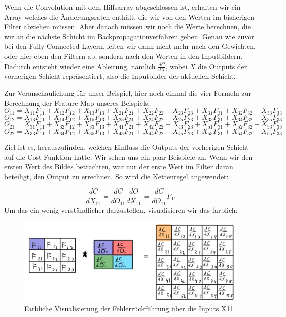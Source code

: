 \documentclass[12pt]{article}
\begin{document}
Wenn die Convolution mit dem Hilfsarray abgeschlossen ist, erhalten wir ein Array welches die Änderungsraten enthält, die wir von den Werten im bisherigen Filter abziehen müssen.
Aber danach müssen wir noch die Werte berechnen, die wir an die nächste Schicht im Backpropagationverfahren geben. Genau wie zuvor bei den Fully Connected Layern, leiten wir dann nicht mehr nach den Gewichten, oder hier eben den Filtern ab, sondern nach den Werten in den Inputbildern. Dadurch entsteht wieder eine Ableitung, nämlich $\frac {dC} {dX}$, wobei $X$ die Outputs der vorherigen Schicht repräsentiert, also die Inputbilder der aktuellen Schicht.

Zur Veranschaulichung für unser Beispiel, hier noch einmal die vier Formeln zur Berechnung der Feature Map unseres Beispiels:
$$O_{11} = X_{11}F_{11}+X_{12}F_{12}+X_{13}F_{13}+X_{21}F_{21}+X_{22}F_{22}+X_{23}F_{23}+X_{31}F_{31}+X_{32}F_{32}+X_{33}F_{33}$$
$$O_{12} = X_{13}F_{11}+X_{14}F_{12}+X_{15}F_{13}+X_{23}F_{21}+X_{24}F_{22}+X_{25}F_{23}+X_{33}F_{31}+X_{34}F_{32}+X_{35}F_{33}$$
$$O_{21} = X_{31}F_{11}+X_{32}F_{12}+X_{33}F_{13}+X_{41}F_{21}+X_{42}F_{22}+X_{43}F_{23}+X_{51}F_{31}+X_{52}F_{32}+X_{53}F_{33}$$
$$O_{22} = X_{33}F_{11}+X_{34}F_{12}+X_{35}F_{13}+X_{43}F_{21}+X_{44}F_{22}+X_{45}F_{23}+X_{53}F_{31}+X_{54}F_{32}+X_{55}F_{33}$$

Ziel ist es, herauszufinden, welchen Einfluss die Outputs der vorherigen Schicht auf die Cost Funktion hatte.
Wir sehen uns ein paar Beispiele an. Wenn wir den ersten Wert des Bildes betrachten, war nur der erste Wert im Filter daran beteiligt, den Output zu errechnen. So wird die Kettenregel angewendet:

$$\frac {dC} {dX_{11}} = 
\frac {dC}{dO_{11}} \frac {dO}{dX_{11}} =
\frac {dC}{dO_{11}} F_{11}$$
Um das ein wenig verständlicher darzustellen, visualisieren wir das farblich:

\begin{figure}[H]
\centering
\includegraphics[scale=0.27]{Images/017_BackProp_X11.png}
\caption{Farbliche Visualisierung der Fehlerrückführung über die Inputs X11}
\label{Farbliche Visualisierung der Fehlerrückführung über die Inputs X11}
\end{figure}
\end{document}
